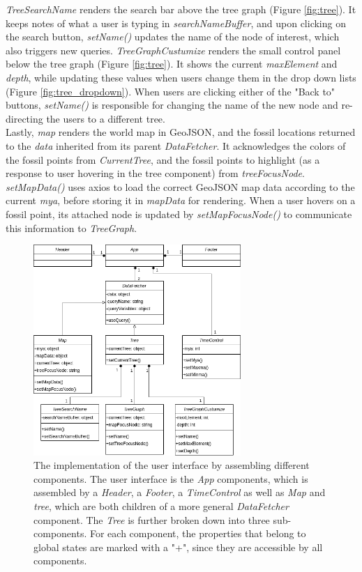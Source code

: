 \documentclass[11pt, a4paper,oneside,chapterprefix=false]{scrbook}
\begin{document}
\emph{TreeSearchName} renders the search bar above the tree graph (Figure \ref{fig:tree}). It keeps notes of what a user is typing in \emph{searchNameBuffer}, and upon clicking on the search button, \emph{setName()} updates the name of the node of interest, which also triggers new queries. \emph{TreeGraphCustumize} renders the small control panel below the tree graph (Figure \ref{fig:tree}). It shows the current \emph{maxElement} and \emph{depth}, while updating these values when users change them in the drop down lists (Figure \ref{fig:tree_dropdown}). When users are clicking either of the "Back to" buttons, \emph{setName()} is responsible for changing the name of the new node and re-directing the users to a different tree. \\

Lastly, \emph{map} renders the world map in GeoJSON, and the fossil locations returned to the \emph{data} inherited from its parent \emph{DataFetcher}. It acknowledges the colors of the fossil points from \emph{CurrentTree}, and the fossil points to highlight (as a response to user hovering in the tree component) from \emph{treeFocusNode}. \emph{setMapData()} uses axios to load the correct GeoJSON map data according to the current \emph{mya}, before storing it in \emph{mapData} for rendering. When a user hovers on a fossil point, its attached node is updated by \emph{setMapFocusNode()} to communicate this information to \emph{TreeGraph}.

\begin{figure}[h]
	\centering
	\includegraphics[width=0.7\textwidth]{figures/implementation/components}
	\caption{The implementation of the user interface by assembling different components. The user interface is the \emph{App} components, which is assembled by a \emph{Header}, a \emph{Footer}, a \emph{TimeControl} as well as \emph{Map} and \emph{tree}, which are both children of a more general \emph{DataFetcher} component. The \emph{Tree} is further broken down into three sub-components. For each component, the properties that belong to global states are marked with a "+", since they are accessible by all components.}
	\label{fig:components}
\end{figure}
\end{document}
